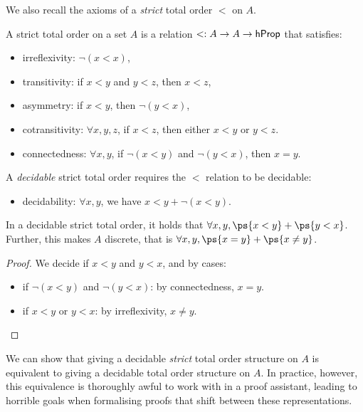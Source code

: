 %
We also recall the axioms of a \emph{strict} total order $<$ on $A$.
\begin{definition}
    \label{def:strict-total-order}
    A strict total order on a set $A$ is a relation $< : A \to A \to \mathsf{hProp}$ that satisfies:
    \begin{itemize}
        \item irreflexivity: $\neg(x < x)$,
        \item transitivity: if $x < y$ and $y < z$, then $x < z$,
        \item asymmetry: if $x < y$, then $\neg(y < x)$,
        \item cotransitivity: $\forall x, y, z$, if $x < z$, then either $x < y$ or $y < z$.
        \item connectedness: $\forall x, y$, if $\neg(x < y)$ and $\neg(y < x)$, then $x = y$.
    \end{itemize}
    A \emph{decidable} strict total order requires the $<$ relation to be decidable:
    \begin{itemize}
        \item decidability: $\forall x, y$, we have $x < y + \neg(x < y)$.
    \end{itemize}
\end{definition}
%
\begin{proposition}
    \label{prop:decidable-strict-total-order}
    In a decidable strict total order, it holds that ${\forall x, y}, \ps{x < y} + \ps{y < x}$.
    Further, this makes $A$ discrete, that is ${\forall x, y}, \ps{x \id y} + \ps{x \neq y}$.
\end{proposition}
\begin{proof}
    We decide if $x < y$ and $y < x$, and by cases:
    \begin{itemize}
        \item if $\neg(x < y)$ and $\neg(y < x)$: by connectedness, $x = y$.
        \item if $x < y$ or $y < x$: by irreflexivity, $x \neq y$.
    \end{itemize}
\end{proof}
%
We can show that giving a decidable \emph{strict} total order structure on $A$
is equivalent to giving a decidable total order structure on $A$.
In practice, however, this equivalence is thoroughly awful to work with in a
proof assistant, leading to horrible goals when formalising proofs that shift
between these representations.

